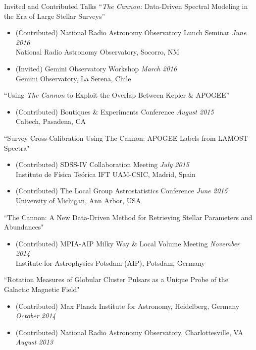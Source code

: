 \documentclass{resume} %
\begin{document}

\begin{rSection}{Invited and Contributed Talks}
``\emph{The Cannon:} Data-Driven Spectral Modeling in the Era of Large Stellar Surveys''
\begin{itemize}
  \item
    (Contributed) National Radio Astronomy Observatory Lunch Seminar 
    \hfill {\em June 2016} \\
    National Radio Astronomy Observatory, Socorro, NM
  \item
  (Invited) Gemini Observatory Workshop \hfill {\em March 2016} \\
  Gemini Observatory, La Serena, Chile
\end{itemize}
``Using \emph{The Cannon} to Exploit the Overlap Between Kepler \& APOGEE''
\begin{itemize}
  \item
    (Contributed) Boutiques \& Experiments Conference \hfill {\em August 2015} \\
    Caltech, Pasadena, CA
\end{itemize}
``Survey Cross-Calibration Using The Cannon: APOGEE Labels from LAMOST Spectra"
\begin{itemize}
\item
(Contributed) SDSS-IV Collaboration Meeting \hfill {\em July 2015} \\
Instituto de Física Teórica IFT UAM-CSIC, Madrid, Spain
\item
(Contributed) The Local Group Astrostatistics Conference \hfill {\em June 2015} \\
University of Michigan, Ann Arbor, USA
\end{itemize}

``The Cannon: A New Data-Driven Method for Retrieving Stellar Parameters and Abundances"
\begin{itemize}
\item
(Contributed) MPIA-AIP Milky Way \& Local Volume Meeting  \hfill {\em November 2014} \\
Institute for Astrophysics Potsdam (AIP), Potsdam, Germany
\end{itemize}

``Rotation Measures of Globular Cluster Pulsars as a Unique Probe of the Galactic Magnetic Field"
\begin{itemize}
\item
(Contributed) Max Planck Institute for Astronomy,
Heidelberg, Germany \hfill {\em October 2014}
\item
(Contributed) National Radio Astronomy Observatory, 
Charlottesville, VA \hfill {\em August 2013} 
\end{itemize}



\end{rSection}
\end{document}
